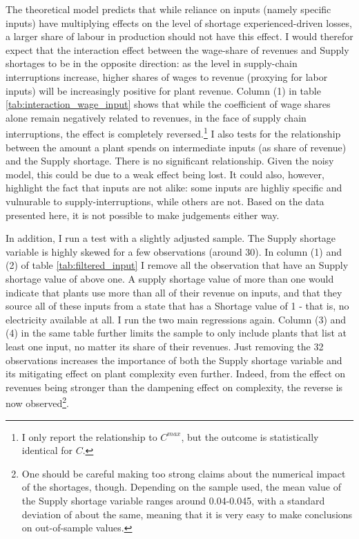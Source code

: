 \documentclass[11pt]{article}
\begin{document}
The theoretical model predicts that while reliance on inputs (namely specific inputs) have multiplying effects on the level of shortage experienced-driven losses, a larger share of labour in production should not have this effect. I would therefor expect that the interaction effect between the wage-share of revenues and Supply shortages to be in the opposite direction: as the level in supply-chain interruptions increase, higher shares of wages to revenue (proxying for labor inputs) will be increasingly positive for plant revenue. Column (1) in table \ref{tab:interaction_wage_input} shows that while the coefficient of wage shares alone remain negatively related to revenues, in the face of supply chain interruptions, the effect is completely reversed.\footnote{I only report the relationship to $C^{max}$, but the outcome is statistically identical for $C$.} I also tests for the relationship between the amount a plant spends on intermediate inputs (as  share of revenue) and the Supply shortage. There is no significant relationship. Given the noisy model, this could be due to a weak effect being lost. It could also, however, highlight the fact that inputs are not alike: some inputs are highliy specific and vulnurable to supply-interruptions, while others are not. Based on the data presented here, it is not possible to make judgements either way.

In addition, I run a test with a slightly adjusted sample. The Supply shortage variable is highly skewed for a few observations (around 30). In column (1) and (2) of table \ref{tab:filtered_input} I remove all the observation that have an Supply shortage value of above one. A supply shortage value of more than one would indicate that plants use more than all of their revenue on inputs, and that they source all of these inputs from a state that has a Shortage value of 1 -  that is, no electricity available at all. I run the two main regressions again. Column (3) and (4) in the same table further limits the sample to only include plants that list at least one input, no matter its share of their revenues. Just removing the 32 observations increases the importance of both the Supply shortage variable and its mitigating effect on plant complexity even further. Indeed, from the effect on revenues being stronger than the dampening effect on complexity, the reverse is now observed\footnote{One should be careful making too strong claims about the numerical impact of the shortages, though. Depending on the sample used, the mean value of the Supply shortage variable ranges around 0.04-0.045, with a standard deviation of about the same, meaning that it is very easy to make conclusions on out-of-sample values.}.
\end{document}
